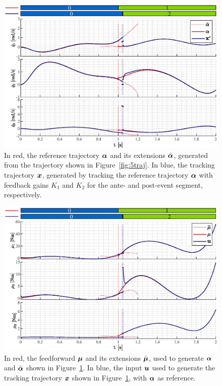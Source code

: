 \documentclass[../DC2019003Bouma.tex]{subfiles}
\begin{document}
\begin{figure}[bt!]
\begin{minipage}[c]{\textwidth}
\centering
\includegraphics[width=\textwidth]{alphaxvel.eps}
\end{minipage}
\caption{In red, the reference trajectory $\boldsymbol{\alpha}$ and its extensions $\bar{\boldsymbol{\alpha}}$, generated from the trajectory shown in Figure~\ref{fig:5traj}. In blue, the tracking trajectory ${\boldsymbol{x}}$, generated by tracking the reference trajectory $\boldsymbol{\alpha}$ with feedback gains $K_1$ and $K_2$ for the ante- and post-event segment, respectively.}\label{fig:5alphasim}
\end{figure}

\begin{figure}[bt!]
\centering
\begin{minipage}[c]{\textwidth}
\centering
\includegraphics[width=\textwidth]{muu.eps}
\end{minipage}
\caption{In red, the feedforward $\boldsymbol{\mu}$ and its extensions $\bar{\boldsymbol{\mu}}$, used to generate $\boldsymbol{\alpha}$ and $\bar{\boldsymbol{\alpha}}$ shown in Figure~\ref{fig:5alphasim}. In blue, the input ${\boldsymbol{u}}$ used to generate the tracking trajectory ${\boldsymbol{x}}$ shown in Figure~\ref{fig:5alphasim}, with $\boldsymbol{\alpha}$ as reference.}\label{fig:5musim}
\end{figure}
\end{document}
